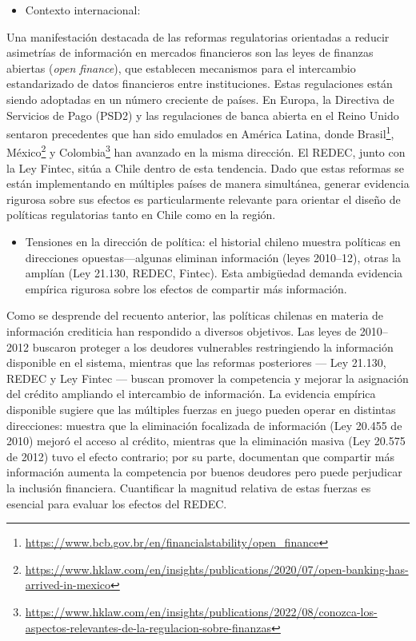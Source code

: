 \documentclass[11pt]{article}
\theoremstyle{plain}
\theoremstyle{plain}
\begin{document}
\begin{itemize}
    \item Contexto internacional:%
\end{itemize} 
Una manifestación destacada de las reformas regulatorias orientadas a reducir asimetrías de información en mercados financieros son las leyes de finanzas abiertas (\textit{open finance}), que establecen mecanismos para el intercambio estandarizado de datos financieros entre instituciones. Estas regulaciones están siendo adoptadas en un número creciente de países. En Europa, la Directiva de Servicios de Pago (PSD2) y las regulaciones de banca abierta en el Reino Unido sentaron precedentes que han sido emulados en América Latina, donde Brasil\footnote{\url{https://www.bcb.gov.br/en/financialstability/open_finance}}, México\footnote{\url{https://www.hklaw.com/en/insights/publications/2020/07/open-banking-has-arrived-in-mexico}} y Colombia\footnote{\url{https://www.hklaw.com/en/insights/publications/2022/08/conozca-los-aspectos-relevantes-de-la-regulacion-sobre-finanzas}} han avanzado en la misma dirección. El REDEC, junto con la Ley Fintec, sitúa a Chile dentro de esta tendencia. Dado que estas reformas se están implementando en múltiples países de manera simultánea, generar evidencia rigurosa sobre sus efectos es particularmente relevante para orientar el diseño de políticas regulatorias tanto en Chile como en la región.



\begin{itemize}
    \item Tensiones en la dirección de política: el historial chileno muestra políticas en direcciones opuestas---algunas eliminan información (leyes 2010--12), otras la amplían (Ley 21.130, REDEC, Fintec). Esta ambigüedad demanda evidencia empírica rigurosa sobre los efectos de compartir más información.
\end{itemize} 
Como se desprende del recuento anterior, las políticas chilenas en materia de información crediticia han respondido a diversos objetivos. Las leyes de 2010--2012 buscaron proteger a los deudores vulnerables restringiendo la información disponible en el sistema, mientras que las reformas posteriores --- Ley 21.130, REDEC y Ley Fintec --- buscan promover la competencia y mejorar la asignación del crédito ampliando el intercambio de información. La evidencia empírica disponible sugiere que las múltiples fuerzas en juego pueden operar en distintas direcciones: \textcite{madeira_impact_2024} muestra que la eliminación focalizada de información (Ley 20.455 de 2010) mejoró el acceso al crédito, mientras que la eliminación masiva (Ley 20.575 de 2012) tuvo el efecto contrario; por su parte, \textcite{foley_effects_2020} documentan que compartir más información aumenta la competencia por buenos deudores pero puede perjudicar la inclusión financiera. Cuantificar la magnitud relativa de estas fuerzas es esencial para evaluar los efectos del REDEC.
\end{document}
